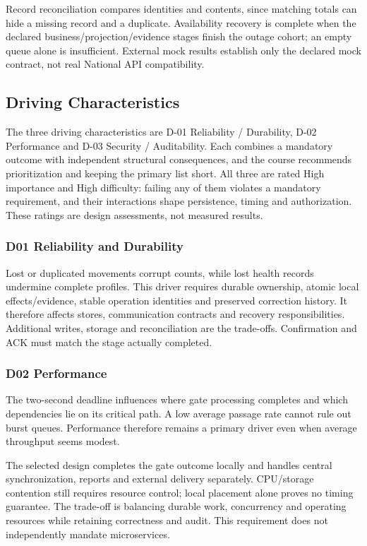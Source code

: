 Record reconciliation compares identities and contents, since matching
totals can hide a missing record and a duplicate. Availability recovery
is complete when the declared business/projection/evidence stages finish
the outage cohort; an empty queue alone is insufficient. External mock
results establish only the declared mock contract, not real National API
compatibility.

\subsection{Driving Characteristics}\label{sec:3.3}

The three driving characteristics are D-01 Reliability / Durability, D-02
Performance and D-03 Security / Auditability. Each combines a mandatory
outcome with independent structural consequences, and the course
recommends prioritization and keeping the primary list short. All three
are rated High importance and High difficulty: failing any of them
violates a mandatory requirement, and their interactions shape
persistence, timing and authorization. These ratings are design
assessments, not measured results.

\subsubsection{D01 Reliability and Durability}\label{sec:3.3.1}

Lost or duplicated movements corrupt counts, while lost health records
undermine complete profiles. This driver requires durable ownership,
atomic local effects/evidence, stable operation identities and preserved
correction history. It therefore affects stores, communication contracts
and recovery responsibilities. Additional writes, storage and
reconciliation are the trade-offs. Confirmation and ACK must match the
stage actually completed.

\subsubsection{D02 Performance}\label{sec:3.3.2}

The two-second deadline influences where gate processing completes and
which dependencies lie on its critical path. A low average passage rate
cannot rule out burst queues. Performance therefore remains a primary
driver even when average throughput seems modest.

The selected design completes the gate outcome locally and handles
central synchronization, reports and external delivery separately.
CPU/storage contention still requires resource control; local placement
alone proves no timing guarantee. The trade-off is balancing durable
work, concurrency and operating resources while retaining correctness
and audit. This requirement does not independently mandate
microservices.

